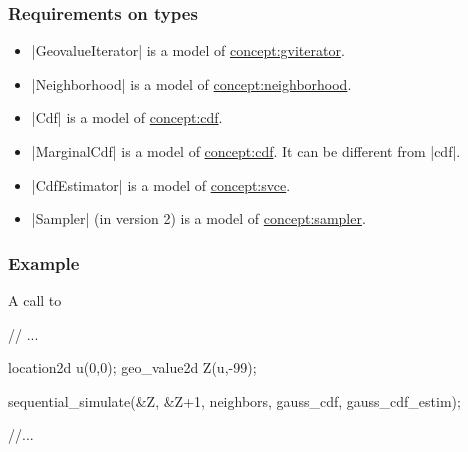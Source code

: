 \documentclass[12pt,twoside]{report}
\begin{document}
\htmlrule[CLEAR=all]  \subsubsection*{Requirements on types}
\begin{itemize}
\item |GeovalueIterator| is a model of \hyperref{Geo-Value Iterator}{Geo-Value Iterator (see Section}{)}{concept:gviterator}.
\item |Neighborhood| is a model of \hyperref{Neighborhood}{Neighborhood (see Section}{)}{concept:neighborhood}. 
\item |Cdf| is a model of \hyperref{CDF}{CDF}{}{concept:cdf}.
\item |MarginalCdf| is a model of \hyperref{CDF}{CDF}{}{concept:cdf}. It can be different from |cdf|.
\item |CdfEstimator| is a model of \hyperref{Single Variable Cdf Estimator}{Single Variable Cdf Estimator (see Section}{)}{concept:svce}.
\item |Sampler| (in version 2) is a model of \hyperref{Sampler}{Sampler (see Section}{)}{concept:sampler}.
\end{itemize}


 

\htmlrule[CLEAR=all]  \subsubsection*{Example}
A call to 


\begin{code}
// ...

location2d u(0,0);
geo_value2d Z(u,-99);

sequential_simulate(&Z, &Z+1,
                    neighbors, gauss_cdf,
                    gauss_cdf_estim);

//...
\end{code}
\end{document}
